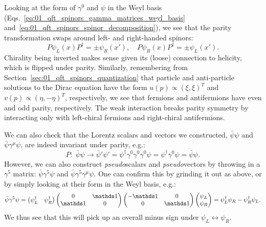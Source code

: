 Looking at the form of $\gamma^0$ and $\psi$ in the Weyl basis (Eqs.~\ref{eq:01_qft_spinors_gamma_matrices_weyl_basis} and~\ref{eq:01_qft_spinors_spinor_decomposition}), we see that the parity transformation swaps around left- and right-handed spinors:
\begin{equation}
	\label{eq:01_qft_spinors_cpt_parity3}
	P\psi_L(x)P^\dagger = \pm \psi_R(x'), \quad P\psi_R(x)P^\dagger = \pm \psi_L(x').
\end{equation}
Chirality being inverted makes sense given its (loose) connection to helicity, which is flipped under parity.
Similarly, remembering from Section~\ref{sec:01_qft_spinors_quantization} that particle and anti-particle solutions to the Dirac equation have the form $u(p) \propto (\xi, \xi)^T$ and $v(p) \propto (\eta, -\eta)^T$, respectively, we see that fermions and antifermions have even and odd parity, respectively.
The weak interaction breaks parity symmetry by interacting only with left-chiral fermions and right-chiral antifermions.

We can also check that the Lorentz scalars and vectors we constructed, $\bar\psi\psi$ and $\bar\psi\gamma^\mu\psi$, are indeed invariant under parity, e.g.:
\begin{equation}
	\label{eq:01_qft_spinors_cpt_scalar}
	P\mathrm{:}\; \bar\psi\psi \rightarrow \bar\psi'\psi' = \psi^\dagger\gamma^0\gamma^0\gamma^0\psi = \psi^\dagger\gamma^0\psi = \bar\psi\psi.
\end{equation}
However, we can also construct \textit{pseudo}scalars and \textit{pseudo}vectors by throwing in a $\gamma^5$ matrix: $\bar\psi\gamma^5\psi$ and $\bar\psi\gamma^5\gamma^\mu\psi$.
One can confirm this by grinding it out as above, or by simply looking at their form in the Weyl basis, e.g.:
\begin{equation}
	\label{eq:01_qft_spinors_cpt_pseudoscalar}
	\bar\psi\gamma^5\psi = \begin{pmatrix} \psi_L^\dagger & \psi_R^\dagger \end{pmatrix} \begin{pmatrix} 0 & \identity \\ \identity & 0 \end{pmatrix} \begin{pmatrix} -\identity & 0 \\ 0 & \identity \end{pmatrix} \begin{pmatrix} \psi_L \\ \psi_R \end{pmatrix} = \psi_L^\dagger\psi_R - \psi_R^\dagger\psi_L.
\end{equation}
We thus see that this will pick up an overall minus sign under $\psi_L \leftrightarrow \psi_R$.


